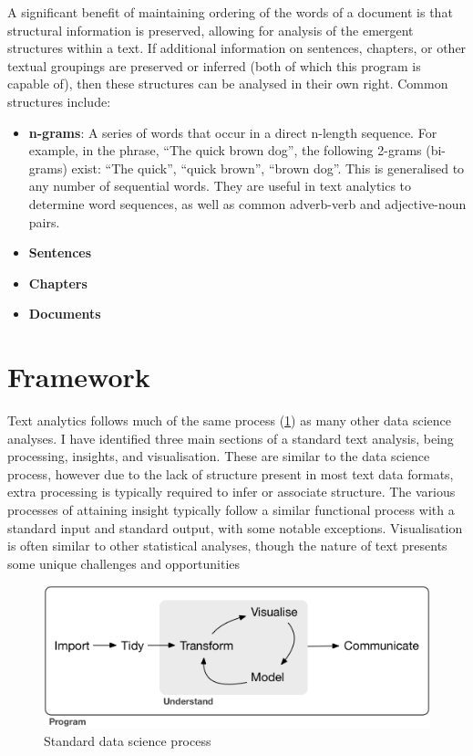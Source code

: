 \documentclass[11pt, a4paper, twoside, titlepage]{report}
\begin{document}
A significant benefit of maintaining ordering of the words of a
document is that structural information is preserved, allowing for
analysis of the emergent structures within a text. If additional
information on sentences, chapters, or other textual groupings are
preserved or inferred (both of which this program is capable of), then
these structures can be analysed in their own right. Common structures
include:

\begin{itemize}
\item \textbf{\gls{n-grams}}: A series of words that occur in a direct
  n-length sequence. For example, in the phrase, ``The quick brown
  dog'', the following 2-grams (bi-grams) exist: ``The quick'', ``quick
  brown'', ``brown dog''. This is generalised to any number of
  sequential words. They are useful in text analytics to determine
  word sequences, as well as common adverb-verb and adjective-noun
  pairs.
\item \textbf{Sentences}
\item \textbf{Chapters}
\item \textbf{Documents}
\end{itemize}

\section{Framework}\label{sec:framework-used}

Text analytics follows much of the same process (\cref{fig:std-ds}) as
many other data science analyses. I have identified three main
sections of a standard text analysis, being processing, insights, and
visualisation. These are similar to the data science process, however
due to the lack of structure present in most text data formats, extra
processing is typically required to infer or associate structure. The
various processes of attaining insight typically follow a similar
functional process with a standard input and standard output, with
some notable exceptions. Visualisation is often similar to other
statistical analyses, though the nature of text presents some unique
challenges and opportunities

\begin{figure}[h]
  \centering
  \includegraphics[scale=0.8]{std-ds.png}
  \caption{Standard data science process\autocite{wickham2016r}\label{fig:std-ds}}
\end{figure}
\end{document}
